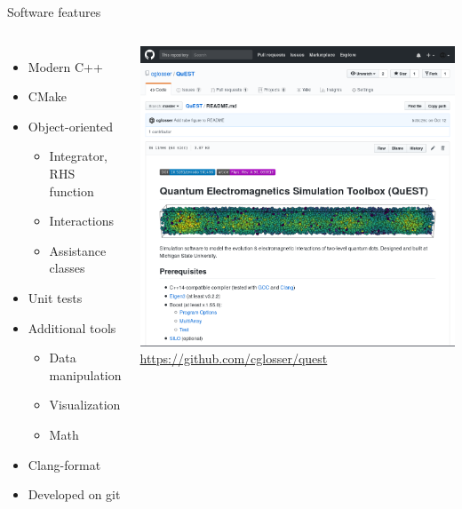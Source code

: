 \documentclass[aspectratio=169, usenames, dvipsnames]{beamer}
\begin{document}
\begin{frame}{Software features}
  \begin{columns}
      \begin{itemize}
        \item Modern C++
        \item CMake
        \item Object-oriented
          \begin{itemize}
            \item Integrator, RHS function
            \item Interactions
            \item Assistance classes
          \end{itemize}
        \item Unit tests
        \item Additional tools
          \begin{itemize}
            \item Data manipulation
            \item Visualization
            \item Math
          \end{itemize}
        \item Clang-format
        \item Developed on git
      \end{itemize}

      \begin{center}
        \vspace{-0.5cm}
        \href{https://www.github.com/cglosser/quest}{
          \includegraphics[width=\textwidth]{figures/github.png}
        }
        \url{https://github.com/cglosser/quest}
      \end{center}
  \end{columns}
\end{frame}
\end{document}
